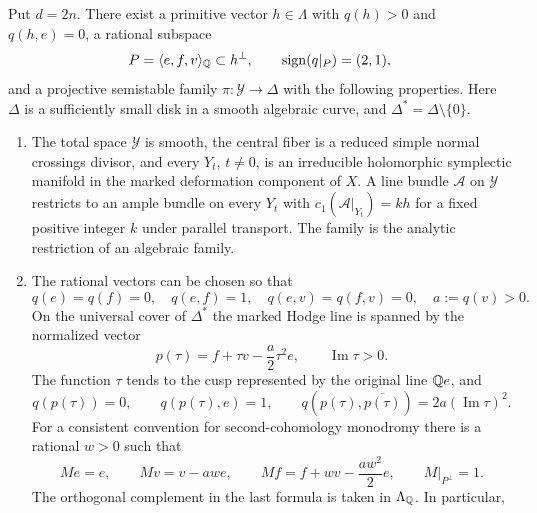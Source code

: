 \begin{samepage}
\begin{proposition}
\label{prop:family}\label{prop:polarized-family}
Put $d=2n$.  There exist a primitive vector $h\in\Lambda$ with
$q(h)>0$ and $q(h,e)=0$, a rational subspace
\[
 P=\langle e,f,v\rangle_{\mathbb Q}\subset h^\perp,
 \qquad \operatorname{sign}(q|_P)=(2,1),
\]
and a projective semistable family $\pi:\mathcal Y\to\Delta$ with
the following properties.  Here $\Delta$ is a sufficiently small disk
in a smooth algebraic curve, and $\Delta^*=\Delta\setminus\{0\}$.
\begin{enumerate}
\item The total space $\mathcal Y$ is smooth, the central fiber is a
reduced simple normal crossings divisor, and every $Y_t$, $t\ne0$,
is an irreducible holomorphic symplectic manifold in the marked
deformation component of $X$.  A line bundle $\mathcal A$ on
$\mathcal Y$ restricts to an ample bundle on every $Y_t$ with
$c_1(\mathcal A|_{Y_t})=kh$ for a fixed positive integer $k$ under
parallel transport.  The family is the analytic restriction of an
algebraic family.
\item The rational vectors can be chosen so that
\begin{equation}
 \label{eq:family-hyperbolic-basis}
 q(e)=q(f)=0,\quad q(e,f)=1,\quad
 q(e,v)=q(f,v)=0,\quad a:=q(v)>0.
\end{equation}
On the universal cover of $\Delta^*$ the marked Hodge line is spanned
by the normalized vector
\begin{equation}
 \label{eq:family-period}
 p(\tau)=f+\tau v-\frac a2\tau^2e,
 \qquad \operatorname{Im}\tau>0.
\end{equation}
The function $\tau$ tends to the cusp represented by the original
line $\mathbb Q e$, and
\begin{equation}
 \label{eq:family-period-identities}
 q(p(\tau))=0,\qquad q(p(\tau),e)=1,\qquad
 q(p(\tau),\overline{p(\tau)})
       =2a(\operatorname{Im}\tau)^2.
\end{equation}
For a consistent convention for second-cohomology monodromy there
is a rational $w>0$ such that
\begin{equation}
 \label{eq:family-monodromy}
 Me=e,\qquad Mv=v-aw e,\qquad
 Mf=f+w v-\frac{aw^2}{2}e,
 \qquad M|_{P^\perp}=1.
\end{equation}
The orthogonal complement in the last formula is taken in
$\Lambda_{\mathbb Q}$.  In particular,
\begin{equation}
 \label{eq:family-monodromy-image}

\end{equation}
\end{enumerate}
\end{proposition}
\end{samepage}
